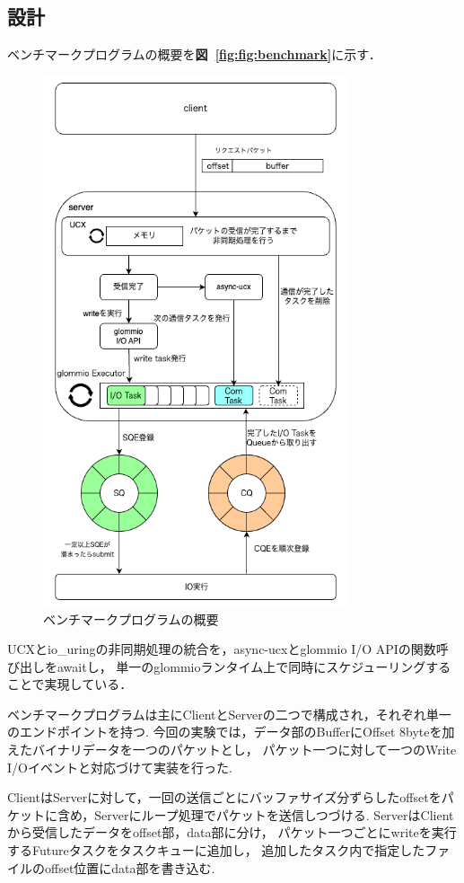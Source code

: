 \documentclass[a4paper,11pt]{jreport}
\newcommand\figref[1]{\textbf{図~\ref{fig:#1}}}
\begin{document}
\subsection{設計}\label{sec:io_rpc_benchprog}
ベンチマークプログラムの概要を\figref{fig:benchmark}に示す．
\begin{figure}[tb]
	\centering
	\includegraphics[width=9cm, bb=0 0 520 710]{figures/rpc_overview.png}
	\caption{ベンチマークプログラムの概要}
	\label{fig:benchmark}
\end{figure}

UCXとio\_uringの非同期処理の統合を，async-ucxとglommio I/O APIの関数呼び出しをawaitし，
単一のglommioランタイム上で同時にスケジューリングすることで実現している．

ベンチマークプログラムは主にClientとServerの二つで構成され，それぞれ単一のエンドポイントを持つ.
今回の実験では，データ部のBufferにOffset 8byteを加えたバイナリデータを一つのパケットとし，
パケット一つに対して一つのWrite I/Oイベントと対応づけて実装を行った.

ClientはServerに対して，一回の送信ごとにバッファサイズ分ずらしたoffsetをパケットに含め，Serverにループ処理でパケットを送信しつづける.
ServerはClientから受信したデータをoffset部，data部に分け，
パケット一つごとにwriteを実行するFutureタスクをタスクキューに追加し，
追加したタスク内で指定したファイルのoffset位置にdata部を書き込む.
\end{document}
